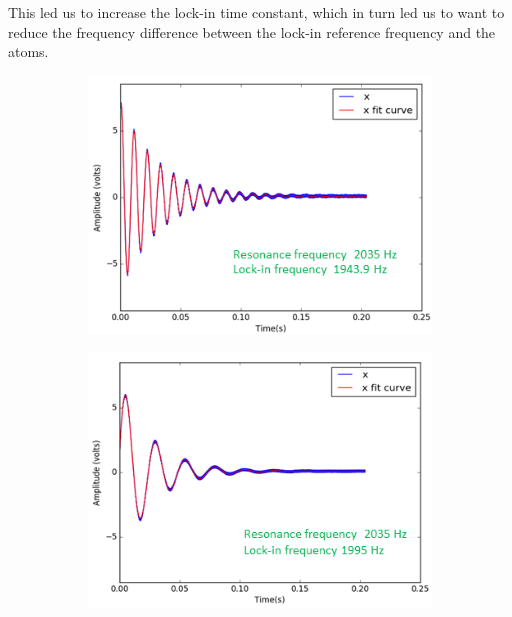 This led us to increase the lock-in time constant, which in turn led
us to want to reduce the frequency difference between the lock-in
reference frequency and the atoms.

\begin{figure}
  \centering
  \begin{subfigure}[b]{0.4\textwidth}
    \centering
    \includegraphics[width=\textwidth]{figures/reference_frequency1}
    \caption{}
    \label{fig:far from resonance}
  \end{subfigure}
  \hfill
  \begin{subfigure}[b]{0.4\textwidth}
    \centering
    \includegraphics[width=\textwidth]{figures/reference_frequency3}

\end{subfigure}
\end{figure}
